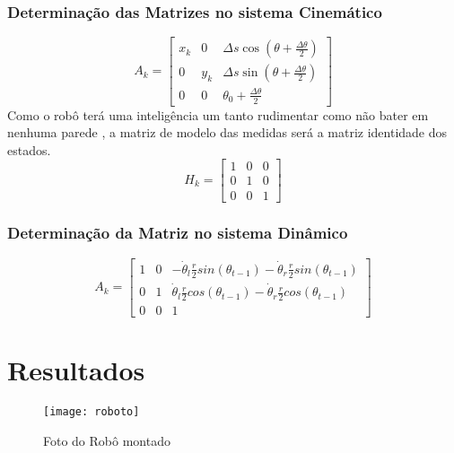 \documentclass[11pt]{article}
\begin{document}
 \subsubsection{Determinação das Matrizes no sistema Cinemático}
 $$
A_k=\left[\begin{array}{ccc}
 x_k&0 &\Delta s \cos(\theta + \frac{\Delta \theta}{2}) \\
 0&y_k &\Delta s \sin(\theta + \frac{\Delta \theta}{2}) \\
 0&0&\theta_0 +\frac{\Delta \theta}{2}
\end{array}\right]
$$
Como o robô terá uma inteligência um tanto rudimentar como não bater em nenhuma parede , a matriz de modelo das medidas será a matriz identidade dos estados.
$$H_k=
\left[
\begin{array}{ccc}
1 & 0 & 0\\
0 & 1 & 0\\
0 & 0 & 1
\end{array}
\right]
$$
\subsubsection{Determinação da Matriz no sistema Dinâmico}
$$
A_k=\left[
\begin{array}{ccc}
1 & 0 & -\dot{\theta}_l\frac{r}{2}sin(\theta_{t-1})-\dot{\theta}_r\frac{r}{2}sin(\theta_{t-1})           \\
0 & 1 & \dot{\theta}_l\frac{r}{2}cos(\theta_{t-1})-\dot{\theta}_r\frac{r}{2}cos(\theta_{t-1})                     \\
0 & 0 & 1
\end{array}
\right]
$$
\section{Resultados}
  \begin{center}
 \begin{figure}[!h]
 \texttt{[image: roboto]}
 \caption{Foto do Robô montado} 
 \end{figure}
 \end{center}
\end{document}
